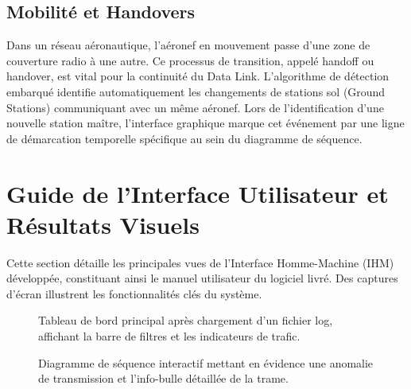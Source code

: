 \documentclass[a4paper,11pt]{report}
\begin{document}
\section{Mobilité et Handovers}
Dans un réseau aéronautique, l'aéronef en mouvement passe d'une zone de couverture radio à une autre. Ce processus de transition, appelé handoff ou handover, est vital pour la continuité du Data Link. L'algorithme de détection embarqué identifie automatiquement les changements de stations sol (Ground Stations) communiquant avec un même aéronef. Lors de l'identification d'une nouvelle station maître, l'interface graphique marque cet événement par une ligne de démarcation temporelle spécifique au sein du diagramme de séquence.

\chapter{Guide de l'Interface Utilisateur et Résultats Visuels}

Cette section détaille les principales vues de l'Interface Homme-Machine (IHM) développée, constituant ainsi le manuel utilisateur du logiciel livré. Des captures d'écran illustrent les fonctionnalités clés du système.

\begin{figure}[htbp]
    \centering
    \caption{Tableau de bord principal après chargement d'un fichier log, affichant la barre de filtres et les indicateurs de trafic.}
    \label{fig:dashboard}
\end{figure}

\begin{figure}[htbp]
    \centering
    \caption{Diagramme de séquence interactif mettant en évidence une anomalie de transmission et l'info-bulle détaillée de la trame.}
    \label{fig:sequence_diagram}
\end{figure}
\end{document}

